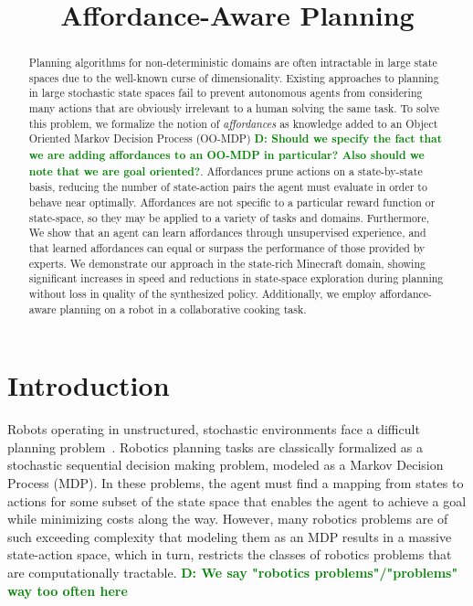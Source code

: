 \documentclass[conference]{IEEEtran}
\newcommand{\dnote}[1]{\textcolor{Green}{\textbf{D: #1}}}
\begin{document}
\title{Affordance-Aware Planning}

\author{
}

\maketitle

\begin{abstract}
Planning algorithms for non-deterministic domains are often
intractable in large state spaces due to the well-known curse of
dimensionality. Existing approaches to planning in large stochastic state spaces fail to
prevent autonomous agents from considering many actions that are
obviously irrelevant to a human solving the same task. To solve this problem,
we formalize the notion of {\em affordances} as knowledge added to an 
Object Oriented Markov Decision Process (OO-MDP) \dnote{Should we specify the fact that
we are adding affordances to an OO-MDP in particular? Also should we note that we are goal oriented?}.
Affordances prune actions on a state-by-state basis, reducing the number of 
state-action pairs the agent must evaluate in order to behave near optimally.
Affordances are not specific to a particular reward function
or state-space, so they may be applied to a variety of tasks and domains. 
Furthermore, We show that an agent can learn affordances through unsupervised experience, and that learned
affordances can equal or surpass the performance of those
provided by experts. We demonstrate our approach in the state-rich Minecraft domain, showing significant
increases in speed and reductions in state-space exploration during
planning without loss in quality of the synthesized policy. Additionally, we 
employ affordance-aware planning on a robot in a collaborative cooking task. 

\end{abstract}

\IEEEpeerreviewmaketitle

\section{Introduction}
\label{sec:introduction}

Robots operating in unstructured, stochastic environments face
a difficult planning problem~\citep{bollini12,knepper13}.
Robotics planning tasks are classically formalized as a stochastic sequential
decision making problem, modeled as a Markov Decision Process (MDP). In these problems,
the agent must find a mapping from states to actions for some subset of the state space that enables the
agent to achieve a goal while minimizing costs along the way. However, many robotics 
problems are of such exceeding complexity that modeling them as an MDP
results in a massive state-action space, which in turn, restricts the classes of 
robotics problems that are computationally tractable.
 \dnote{We say "robotics problems"/"problems" way too often here}
 
\end{document}
